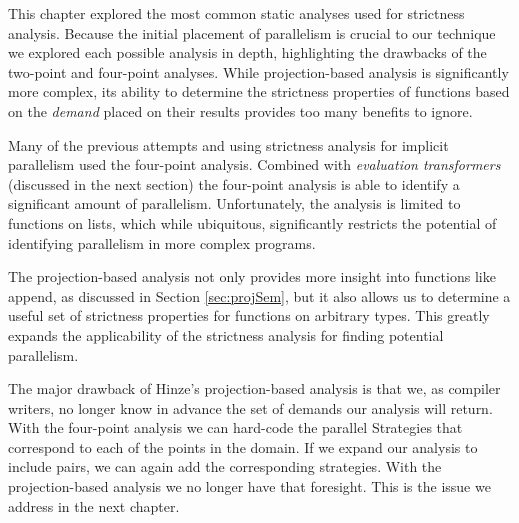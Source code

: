 This chapter explored the most common static analyses used for strictness
analysis.  Because the initial placement of parallelism is crucial to our
technique we explored each possible analysis in depth, highlighting the
drawbacks of the two-point and four-point analyses. While projection-based
analysis is significantly more complex, its ability to determine the strictness
properties of functions based on the \emph{demand} placed on their results
provides too many benefits to ignore.

Many of the previous attempts and using strictness analysis for implicit
parallelism used the four-point analysis. Combined with \emph{evaluation
transformers} (discussed in the next section) the four-point analysis is able
to identify a significant amount of parallelism. Unfortunately, the analysis is
limited to functions on lists, which while ubiquitous, significantly restricts
the potential of identifying parallelism in more complex programs.

The projection-based analysis not only provides more insight into functions
like \<append\>, as discussed in Section \ref{sec:projSem}, but it also allows
us to determine a useful set of strictness properties for functions on
arbitrary types. This greatly expands the applicability of the strictness
analysis for finding potential parallelism.

The major drawback of Hinze's projection-based analysis is that we, as compiler
writers, no longer know in advance the set of demands our analysis will return.
With the four-point analysis we can hard-code the parallel Strategies that
correspond to each of the points in the domain. If we expand our analysis to
include pairs, we can again add the corresponding strategies. With the
projection-based analysis we no longer have that foresight. This is the issue
we address in the next chapter.
